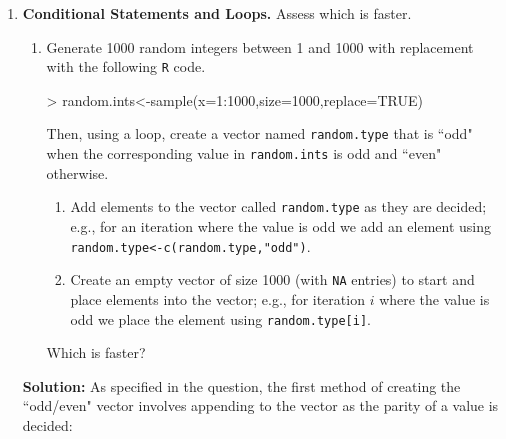 \documentclass{article}
\begin{document}
\begin{enumerate}
  \item \textbf{Conditional Statements and Loops.} Assess which is faster.
  \begin{enumerate}
    \item Generate 1000 random integers between 1 and 1000 with replacement with
    the following \texttt{R} code.
\begin{Schunk}
\begin{Sinput}
> random.ints<-sample(x=1:1000,size=1000,replace=TRUE)
\end{Sinput}
\end{Schunk}
    Then, using a loop, create a vector named \texttt{random.type} that is ``odd"
    when the corresponding value in \texttt{random.ints} is odd and ``even" otherwise.
    \begin{enumerate}
      \item Add elements to the vector called \texttt{random.type} as they
      are decided; e.g., for an iteration where the value is odd we add
      an element using \texttt{random.type<-c(random.type,"odd")}.
      \item Create an empty vector of size 1000 (with \texttt{NA} entries) to 
      start and place elements into the vector; e.g., for iteration $i$
      where the value is odd we place the element using \texttt{random.type[i]}.
    \end{enumerate}
    Which is faster?
\end{enumerate}
\textbf{Solution:} 
As specified in the question, the first method of creating the ``odd/even"
vector involves appending to the vector as the parity of a value is decided:

\begin{Schunk}
\end{Schunk}


\end{enumerate}
\end{document}
